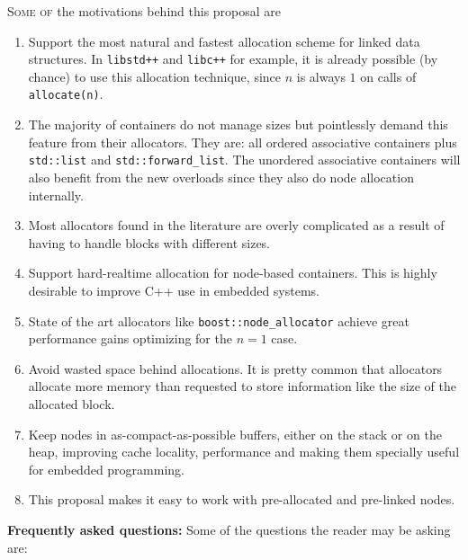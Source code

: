 \documentclass[11pt]{article}
\begin{document}
\textsc{Some of} the motivations behind this proposal are
\begin{enumerate}

\item Support the most natural and fastest allocation scheme for
linked data structures. In \texttt{libstd++} and \texttt{libc++}
for example, it is already possible (by chance) to use this allocation
technique, since $n$ is always $1$ on calls of \texttt{allocate(n)}.

\item The majority of containers do not manage sizes but pointlessly demand
this feature from their allocators. They are: all ordered associative
containers plus \texttt{std::list} and \texttt{std::forward\_list}. The
unordered associative containers will also benefit from the new overloads since
they also do node allocation internally.

\item Most allocators found in the literature are overly
complicated as a result of having to handle blocks with different
sizes.

\item Support hard-realtime allocation for node-based containers.
This is highly desirable to improve C++ use in embedded systems.

\item State of the art allocators like \texttt{boost::node\_allocator}
\cite{boost} achieve great performance gains optimizing for the $n = 1$ case. 

\item Avoid wasted space behind allocations. It is pretty common that
allocators allocate more memory than requested to store information
like the size of the allocated block.

\item Keep nodes in as-compact-as-possible buffers, either on the
stack or on the heap, improving cache locality, performance and making
them specially useful for embedded programming.

\item This proposal makes it easy to work with pre-allocated and
pre-linked nodes.
\end{enumerate}

\medskip
\noindent
{\bf Frequently asked questions:} Some of the questions the reader
may be asking are:
\end{document}
